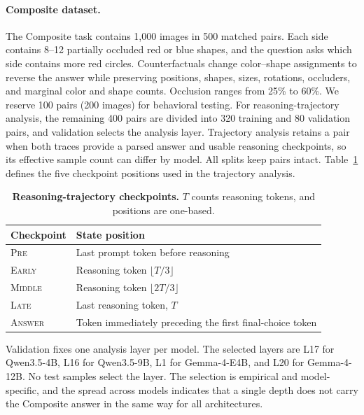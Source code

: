 \documentclass{article} %
\begin{document}
\paragraph{Composite dataset.}
The Composite task contains 1,000 images in 500 matched pairs. Each side contains 8--12 partially occluded red or blue shapes, and the question asks which side contains more red circles. Counterfactuals change color--shape assignments to reverse the answer while preserving positions, shapes, sizes, rotations, occluders, and marginal color and shape counts. Occlusion ranges from 25\% to 60\%. We reserve 100 pairs (200 images) for behavioral testing. For reasoning-trajectory analysis, the remaining 400 pairs are divided into 320 training and 80 validation pairs, and validation selects the analysis layer. Trajectory analysis retains a pair when both traces provide a parsed answer and usable reasoning checkpoints, so its effective sample count can differ by model. All splits keep pairs intact. Table~\ref{tab:reasoning_checkpoints} defines the five checkpoint positions used in the trajectory analysis.

\begin{table}[H]
\centering\small
\renewcommand{\arraystretch}{1.05}
\setlength{\tabcolsep}{4pt}
\caption{\textbf{Reasoning-trajectory checkpoints.} $T$ counts reasoning tokens, and positions are one-based.}
\label{tab:reasoning_checkpoints}
\begin{tabular*}{\textwidth}{@{\extracolsep{\fill}}lp{}@{}}
\toprule
Checkpoint & State position \\
\midrule
\textsc{Pre} & Last prompt token before reasoning \\
\textsc{Early} & Reasoning token $\lfloor T/3\rfloor$ \\
\textsc{Middle} & Reasoning token $\lfloor 2T/3\rfloor$ \\
\textsc{Late} & Last reasoning token, $T$ \\
\textsc{Answer} & Token immediately preceding the first final-choice token \\
\bottomrule
\end{tabular*}
\end{table}

Validation fixes one analysis layer per model. The selected layers are L17 for Qwen3.5-4B, L16 for Qwen3.5-9B, L1 for Gemma-4-E4B, and L20 for Gemma-4-12B. No test samples select the layer. The selection is empirical and model-specific, and the spread across models indicates that a single depth does not carry the Composite answer in the same way for all architectures.
\end{document}
